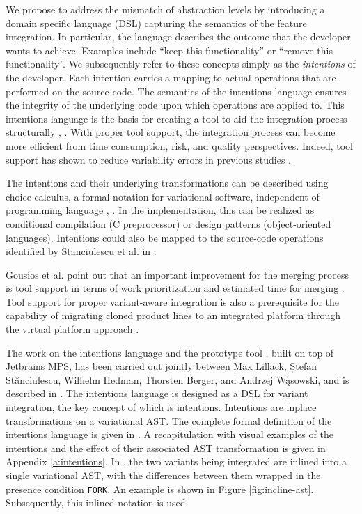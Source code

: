 We propose to address the mismatch of abstraction levels by introducing a domain specific language (DSL) capturing the semantics of the feature integration. In particular, the language describes the outcome that the developer wants to achieve. Examples include ``keep this functionality'' or ``remove this functionality''. We subsequently refer to these concepts simply as the \textit{intentions} of the developer. Each intention carries a mapping to actual operations that are performed on the source code. The semantics of the intentions language ensures the integrity of the underlying code upon which operations are applied to. This intentions language is the basis for creating a tool to aid the integration process structurally \cite{mens2002}, \cite{apel2011}. With proper tool support, the integration process can become more efficient from time consumption, risk, and quality perspectives. Indeed, tool support has shown to reduce variability errors in previous studies \cite{ribeiro2014emergent}.

The intentions and their underlying transformations can be described using choice calculus, a formal notation for variational software, independent of programming language \cite{erwig2011choice}, \cite{walkingshaw2012choice}. In the implementation, this can be realized as conditional compilation (C preprocessor) or  design patterns (object-oriented languages). Intentions could also be mapped to the source-code operations identified by Stanciulescu et al. in \cite{stanciulescu2016concepts}.

Gousios et al. point out that an important improvement for the merging process is tool support in terms of work prioritization and estimated time for merging \cite{gousios2015}. Tool support for proper variant-aware integration is also a prerequisite for the capability of migrating cloned product lines to an integrated platform through the virtual platform approach \cite{antkiewicz2014flexible}.

The work on the intentions language and the prototype tool \tooln, built on top of Jetbrains MPS, has been carried out jointly between Max Lillack, Ștefan St\u{a}nciulescu, Wilhelm Hedman, Thorsten Berger, and Andrzej W\k{a}sowski, and is described in \cite{lillack2017intentions}. The intentions language is designed as a DSL for variant integration, the key concept of which is intentions. Intentions are inplace transformations on a variational AST. The complete formal definition of the intentions language is given in \cite{lillack2017intentions}. A recapitulation with visual examples of the intentions and the effect of their associated AST transformation is given in Appendix \ref{a:intentions}. In \tooln, the two variants being integrated are inlined into a single variational AST, with the differences between them wrapped in the presence condition \texttt{FORK}. An example is shown in Figure \ref{fig:incline-ast}. Subsequently, this inlined notation is used.


